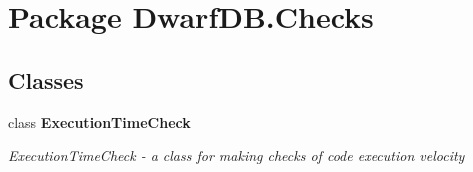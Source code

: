 \hypertarget{namespace_dwarf_d_b_1_1_checks}{\section{Package Dwarf\+D\+B.\+Checks}
\label{namespace_dwarf_d_b_1_1_checks}
}
\subsection*{Classes}
\begin{DoxyCompactItemize}
\item 
class {\bfseries Execution\+Time\+Check}
\begin{DoxyCompactList}\small\item\em Execution\+Time\+Check -\/ a class for making checks of code execution velocity \end{DoxyCompactList}\end{DoxyCompactItemize}
